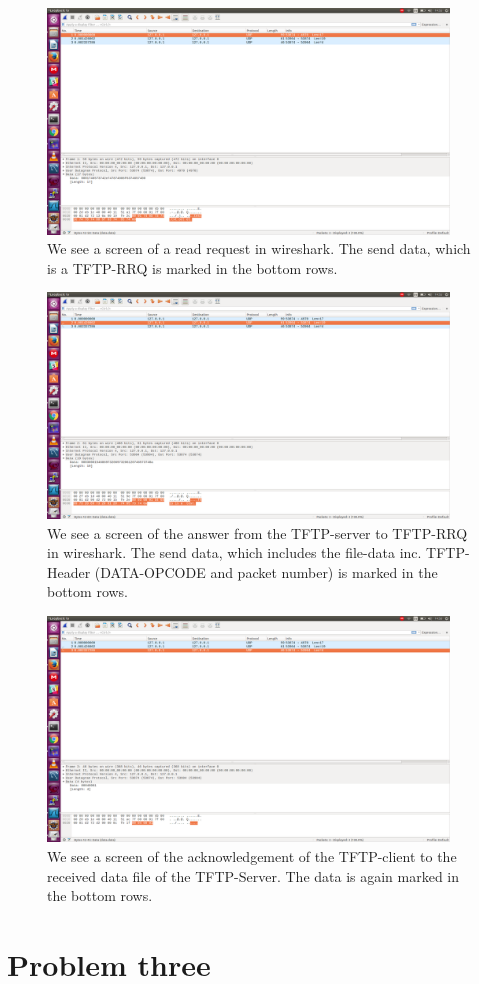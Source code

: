\documentclass[a4paper,12pt]{article}
\numberwithin{figure}{section}
\begin{document}
\begin{figure}[h!]
	\centering
	\includegraphics[width=0.95\textwidth,keepaspectratio]{img/Line1Wireshark.png} 
	\caption{We see a screen of a read request in wireshark. The send data, which is a TFTP-RRQ is marked in the bottom rows.}
	\label{ws1}
\end{figure}

\begin{figure}[h!]
	\centering
	\includegraphics[width=0.95\textwidth,keepaspectratio]{img/Line2Wireshark.png} 
	\caption{We see a screen of the answer from the TFTP-server to TFTP-RRQ in wireshark. The send data, which includes the file-data inc. TFTP-Header (DATA-OPCODE and packet number) is marked in the bottom rows.}
	\label{ws2}
\end{figure}

\begin{figure}[h!]
	\centering
	\includegraphics[width=0.95\textwidth,keepaspectratio]{img/Line3Wireshark.png} 
	\caption{We see a screen of the acknowledgement of the TFTP-client to the received data file of the TFTP-Server. The data is again marked in the bottom rows.}
	\label{ws3}
\end{figure}

\newpage

\section{Problem three}
\end{document}
